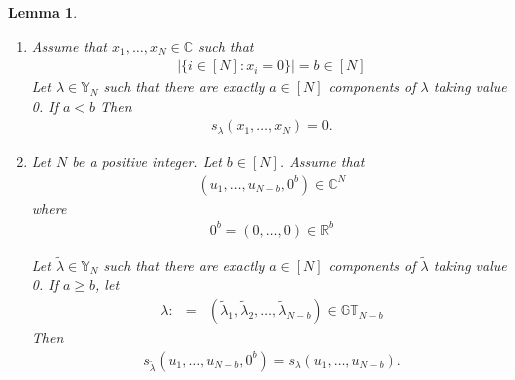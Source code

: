 \documentclass[10pt,a4paper]{amsart}
\newtheorem{lemma}{Lemma}
\newcommand\CC{\mathbb{C}}
\newcommand\GT{\mathbb{G}\mathbb{T}}
\newcommand\RR{{\mathbb R}}
\newcommand\YY{\mathbb{Y}}
\begin{document}
\begin{lemma}\label{l212}
\begin{enumerate}
\item Assume that $x_1,\ldots,x_N\in \CC$ such that
\begin{eqnarray}
|\{i\in [N]: x_i=0\}|=b\in [N]\label{bz}
\end{eqnarray}
Let $\lambda\in \YY_N$ such that there are exactly $a \in[N]$ components of $\lambda$ taking value 0. If $a<b$
 Then
\begin{eqnarray}
s_{\lambda}(x_1,\ldots,x_N)=0.\label{shz}
\end{eqnarray}
\item Let $N$ be a positive integer. Let $b\in[N]$. Assume that 
\begin{eqnarray*}
(u_1,\ldots,u_{N-b},0^{b})\in \CC^N
\end{eqnarray*}
where 
\begin{eqnarray*}
0^{b}=(0,\ldots,0)\in \RR^{b}
\end{eqnarray*}


Let $\tilde{\lambda}\in \YY_N$ such that there are exactly $a \in[N]$ components of $\tilde{\lambda}$ taking value 0.
If $a\geq b$, let 
\begin{eqnarray}
\lambda:&=&(\tilde{\lambda}_1,\tilde{\lambda}_2,\ldots,\tilde{\lambda}_{N-b})\in \GT_{N-b}\label{dtl}
\end{eqnarray}
 Then
\begin{eqnarray*}
s_{\tilde{\lambda}}(u_1,\ldots,u_{N-b},0^b)=s_{\lambda}(u_1,\ldots,u_{N-b}).
\end{eqnarray*}
\end{enumerate}
\end{lemma}
\end{document}
